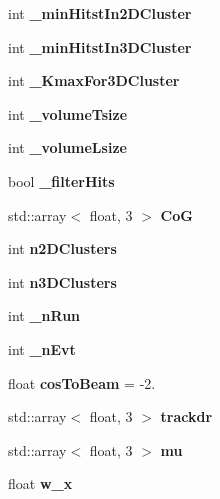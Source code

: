 \begin{DoxyCompactItemize}
\item 
int {\bfseries \-\_\-min\-Hitst\-In2\-D\-Cluster}\label{classCALICE_1_1ClusterCounter_afa8b19f9538e5f67619b6b2f9da26eef}

\item 
int {\bfseries \-\_\-min\-Hitst\-In3\-D\-Cluster}\label{classCALICE_1_1ClusterCounter_af26ed7b753085b8d18c291866a01641d}

\item 
int {\bfseries \-\_\-\-Kmax\-For3\-D\-Cluster}\label{classCALICE_1_1ClusterCounter_a34a45c42488d5fb2b42d064b1001896d}

\item 
int {\bfseries \-\_\-volume\-Tsize}\label{classCALICE_1_1ClusterCounter_a9d7ee1bd08670973f52411830c558b51}

\item 
int {\bfseries \-\_\-volume\-Lsize}\label{classCALICE_1_1ClusterCounter_a1d36c4726d82e0dcd6f62e565565f3a5}

\item 
bool {\bfseries \-\_\-filter\-Hits}\label{classCALICE_1_1ClusterCounter_a24eea26f3210c9e6b3d645c5da02094b}

\item 
std\-::array$<$ float, 3 $>$ {\bfseries Co\-G}\label{classCALICE_1_1ClusterCounter_a24adb4a8cb17221b9824af53e990c587}

\item 
int {\bfseries n2\-D\-Clusters}\label{classCALICE_1_1ClusterCounter_a5a60f78ab7d7420fb40ef88071d83685}

\item 
int {\bfseries n3\-D\-Clusters}\label{classCALICE_1_1ClusterCounter_a56495d0202d0c80204f07e092152b6a1}

\item 
int {\bf \-\_\-n\-Run}
\item 
int {\bf \-\_\-n\-Evt}
\item 
float {\bfseries cos\-To\-Beam} = -\/2.\label{classCALICE_1_1ClusterCounter_a52a7998cbc4329982ec23b26bdececcc}

\item 
std\-::array$<$ float, 3 $>$ {\bfseries trackdr}\label{classCALICE_1_1ClusterCounter_a7f6731c5a090d8460117a94e02c944f0}

\item 
std\-::array$<$ float, 3 $>$ {\bfseries mu}\label{classCALICE_1_1ClusterCounter_a873256023111e24ee3a5caee51e04b3f}

\item 
float {\bfseries w\-\_\-x}\label{classCALICE_1_1ClusterCounter_a51e43848f80981936b3a4140b2d6f001}


\end{DoxyCompactItemize}
